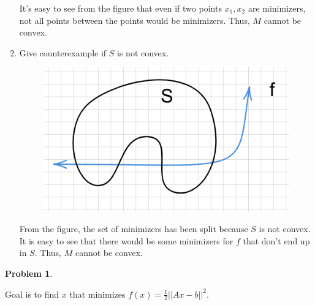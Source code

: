 \documentclass[11pt]{article}
\theoremstyle{definition}
\theoremstyle{case}
\theoremstyle{theorem}
\newtheorem{prob}{Problem}
\begin{document}
\begin{enumerate}[label=(\alph*)]
It's easy to see from the figure that even if two points $x_1, x_2$ are minimizers, not
all points between the points would be minimizers. Thus, $M$ cannot be convex.

\item Give counterexample if $S$ is not convex.

\begin{figure}[h!]
  \centering
  \includegraphics[totalheight=3cm]{images/s-not-convex.png}
\end{figure}

From the figure, the set of minimizers has been split because $S$ is not convex. It is easy 
to see that there would be some minimizers for $f$ that don't end up in $S$. Thus, $M$ cannot
be convex.

\end{enumerate}

\newpage

\begin{prob}
\end{prob}

Goal is to find $x$ that minimizes $f(x) = \frac{1}{2} ||Ax - b||^2$.
\end{document}

